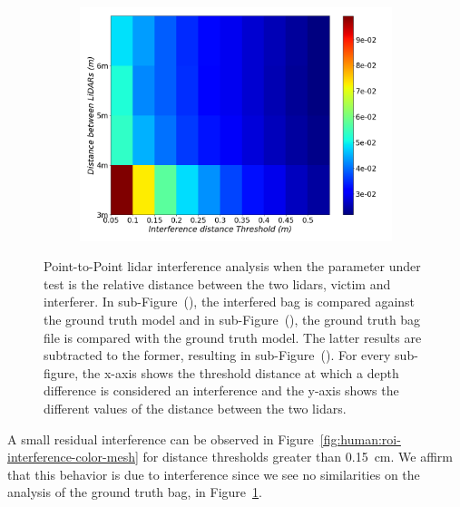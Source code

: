 \begin{figure}[!ht]
\begin{subfigure}[c]{0.45\textwidth}
		\caption{}
		\label{fig:human:roi-ground-truth-color-mesh}
	\end{subfigure}
	\\ \vspace{2mm}
	\begin{subfigure}[c]{0.6\textwidth}
		\centering
		\includegraphics[width=\textwidth]{img/lidar-interference/human/difference_roi_distance_color_mesh.png}
		\caption{}
		\label{fig:human:roi-difference-color-mesh}
	\end{subfigure}

	\caption[Point-to-Point analysis of the interference on the seleced \ac{roi} of the \textit{Human} dataset.]{Point-to-Point \ac{lidar} interference analysis when the parameter under test is the relative distance between the two \acp{lidar}, victim and interferer. In sub-Figure~(), the interfered bag is compared against the ground truth model and in sub-Figure~(), the ground truth bag file is compared with the ground truth model. The latter results are subtracted to the former, resulting in sub-Figure~(). For every sub-figure, the x-axis shows the threshold distance at which a depth difference is considered an interference and the y-axis shows the different values of the distance between the two \acp{lidar}.} 
	\label{fig:human:roi-color-mesh}
\end{figure}

A small residual interference can be observed in Figure~\ref{fig:human:roi-interference-color-mesh} for distance thresholds greater than \SI{0.15}{\centi\meter}. We affirm that this behavior is due to interference since we see no similarities on the analysis of the ground truth bag, in Figure~\ref{fig:human:roi-ground-truth-color-mesh}.


